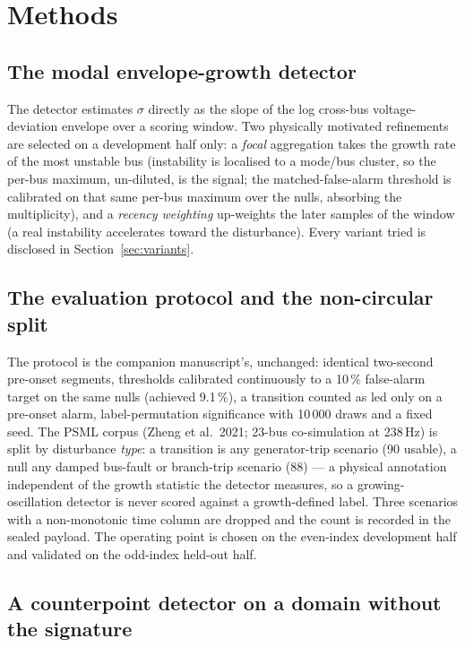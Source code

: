 \documentclass[aip,cha,preprint,amsmath,amssymb]{revtex4-2}
\begin{document}
\section{Methods}\label{sec:methods}

\subsection{The modal envelope-growth detector}

The detector estimates $\sigma$ directly as the slope of the log
cross-bus voltage-deviation envelope over a scoring window. Two
physically motivated refinements are selected on a development half
only: a \emph{focal} aggregation takes the growth rate of the most
unstable bus (instability is localised to a mode/bus cluster, so the
per-bus maximum, un-diluted, is the signal; the matched-false-alarm
threshold is calibrated on that same per-bus maximum over the nulls,
absorbing the multiplicity), and a \emph{recency weighting} up-weights
the later samples of the window (a real instability accelerates toward
the disturbance). Every variant tried is disclosed in
Section~\ref{sec:variants}.

\subsection{The evaluation protocol and the non-circular split}

The protocol is the companion manuscript's, unchanged: identical
two-second pre-onset segments, thresholds calibrated continuously to a
10\,\% false-alarm target on the same nulls (achieved 9.1\,\%), a
transition counted as led only on a pre-onset alarm, label-permutation
significance with 10\,000 draws and a fixed seed. The PSML corpus
(Zheng et al.\ 2021; 23-bus co-simulation at 238\,Hz) is split by
disturbance \emph{type}: a transition is any generator-trip scenario
(90 usable), a null any damped bus-fault or branch-trip scenario (88)
--- a physical annotation independent of the growth statistic the
detector measures, so a growing-oscillation detector is never scored
against a growth-defined label. Three scenarios with a non-monotonic
time column are dropped and the count is recorded in the sealed
payload. The operating point is chosen on the even-index development
half and validated on the odd-index held-out half.

\subsection{A counterpoint detector on a domain without the signature}
\end{document}
